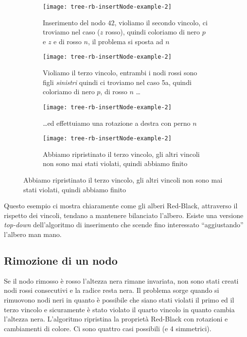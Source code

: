 \vspace{-5pt}
\begin{figure}[H]\centering
	\begin{subfigure}[t]{.48\linewidth}\centering
		\texttt{[image: tree-rb-insertNode-example-2]}
		\caption{Inserimento del nodo \(42\), violiamo il secondo vincolo, ci troviamo nel caso {\footnotesize{}} (\(z\) rosso), quindi coloriamo di nero \(p\) e \(z\) e di rosso \(n\), il problema si sposta ad \(n\)}
	\end{subfigure}
	\hfill
	\begin{subfigure}[t]{.48\linewidth}\centering
		\texttt{[image: tree-rb-insertNode-example-2]}
		\caption{Violiamo il terzo vincolo, entrambi i nodi rossi sono figli \emph{sinistri} quindi ci troviamo nel caso {\footnotesize\ttfamily 5a}, quindi coloriamo di nero \(p\), di rosso \(n\) \dots}
	\end{subfigure}

	\vspace{5pt}

	\begin{subfigure}[t]{.48\linewidth}\centering
		\texttt{[image: tree-rb-insertNode-example-2]}
		\caption{\dots ed effettuiamo una rotazione a destra con perno \(n\)}
	\end{subfigure}
	\hfill
	\begin{subfigure}[b]{.48\linewidth}\centering
		\texttt{[image: tree-rb-insertNode-example-2]}
		\caption{Abbiamo ripristinato il terzo vincolo, gli altri vincoli non sono mai stati violati, quindi abbiamo finito}
	\end{subfigure}
\end{figure}
\vspace{-10pt}

Questo esempio ci mostra chiaramente come gli alberi Red-Black, attraverso il rispetto dei vincoli, tendano a mantenere bilanciato l'albero.
Esiste una versione \emph{top-down} dell'algoritmo di inserimento che scende fino interessato \enquote{aggiustando} l'albero man mano.

\clearpage
\subsection{Rimozione di un nodo}

Se il nodo rimosso è rosso l'altezza nera rimane invariata, non sono stati creati nodi rossi consecutivi e la radice resta nera.
Il problema sorge quando si rimuovono nodi neri in quanto è possibile che siano stati violati il primo ed il terzo vincolo e sicuramente è stato violato il quarto vincolo in quanto cambia l'altezza nera.
L'algoritmo  ripristina la proprietà Red-Black con rotazioni e cambiamenti di colore.
Ci sono quattro casi possibili (e 4 simmetrici).


